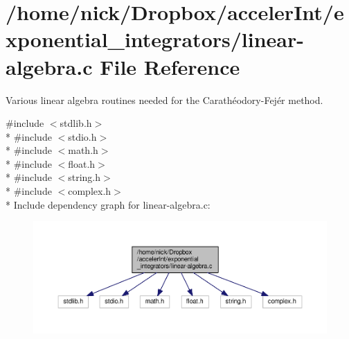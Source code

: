 \hypertarget{linear-algebra_8c}{}\section{/home/nick/\+Dropbox/acceler\+Int/exponential\+\_\+integrators/linear-\/algebra.c File Reference}
\label{linear-algebra_8c}


Various linear algebra routines needed for the Carathéodory-\/\+Fejér method.  


{\ttfamily \#include $<$stdlib.\+h$>$}\\*
{\ttfamily \#include $<$stdio.\+h$>$}\\*
{\ttfamily \#include $<$math.\+h$>$}\\*
{\ttfamily \#include $<$float.\+h$>$}\\*
{\ttfamily \#include $<$string.\+h$>$}\\*
{\ttfamily \#include $<$complex.\+h$>$}\\*
Include dependency graph for linear-\/algebra.c\+:
\nopagebreak
\begin{figure}[H]
\begin{center}
\leavevmode
\includegraphics[width=350pt]{linear-algebra_8c__incl}
\end{center}
\end{figure}
